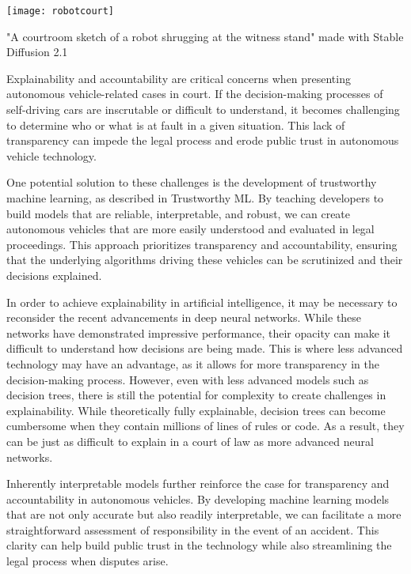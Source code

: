 \begin{marginfigure}[-5.5cm]
        \texttt{[image: robotcourt]}
        \caption{"A courtroom sketch of a robot shrugging at the witness stand" made with Stable Diffusion 2.1}
\end{marginfigure}

Explainability and accountability are critical concerns when presenting autonomous vehicle-related cases in court. If the decision-making processes of self-driving cars are inscrutable or difficult to understand, it becomes challenging to determine who or what is at fault in a given situation. This lack of transparency can impede the legal process and erode public trust in autonomous vehicle technology.

One potential solution to these challenges is the development of trustworthy machine learning, as described in Trustworthy ML. By teaching developers to build models that are reliable, interpretable, and robust, we can create autonomous vehicles that are more easily understood and evaluated in legal proceedings. This approach prioritizes transparency and accountability, ensuring that the underlying algorithms driving these vehicles can be scrutinized and their decisions explained. 

In order to achieve explainability in artificial intelligence, it may be necessary to reconsider the recent advancements in deep neural networks. While these networks have demonstrated impressive performance, their opacity can make it difficult to understand how decisions are being made. This is where less advanced technology may have an advantage, as it allows for more transparency in the decision-making process. However, even with less advanced models such as decision trees, there is still the potential for complexity to create challenges in explainability. While theoretically fully explainable, decision trees can become cumbersome when they contain millions of lines of rules or code. As a result, they can be just as difficult to explain in a court of law as more advanced neural networks.

Inherently interpretable models further reinforce the case for transparency and accountability in autonomous vehicles. By developing machine learning models that are not only accurate but also readily interpretable, we can facilitate a more straightforward assessment of responsibility in the event of an accident. This clarity can help build public trust in the technology while also streamlining the legal process when disputes arise.

